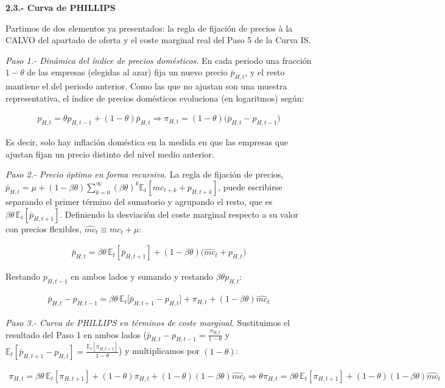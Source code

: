 \documentclass[10pt,a4paper]{article}
\begin{document}
\textbf{2.3.- Curva de PHILLIPS}

Partimos de dos elementos ya presentados: la regla de fijación de precios à la CALVO del apartado de oferta y el coste marginal real del Paso 5 de la Curva IS.

\textit{Paso 1.- Dinámica del índice de precios domésticos.} En cada periodo una fracción $1-\theta$ de las empresas (elegidas al azar) fija un nuevo precio $\bar p_{H,t}$, y el resto mantiene el del periodo anterior. Como las que no ajustan son una muestra representativa, el índice de precios domésticos evoluciona (en logaritmos) según:

$$\begin{aligned}
    p_{H,t}=\theta p_{H,t-1}+(1-\theta)\bar p_{H,t}\Longrightarrow \boxed{\pi_{H,t}=(1-\theta)\big(\bar p_{H,t}-p_{H,t-1}\big)}
\end{aligned}$$

Es decir, solo hay inflación doméstica en la medida en que las empresas que ajustan fijan un precio distinto del nivel medio anterior.

\textit{Paso 2.- Precio óptimo en forma recursiva.} La regla de fijación de precios, $\bar p_{H,t}=\mu+(1-\beta\theta)\sum_{k=0}^{\infty}(\beta\theta)^k\mathbb E_t[mc_{t+k}+p_{H,t+k}]$, puede escribirse separando el primer término del sumatorio y agrupando el resto, que es $\beta\theta\,\mathbb E_t[\bar p_{H,t+1}]$. Definiendo la desviación del coste marginal respecto a su valor con precios flexibles, $\widehat{mc}_t\equiv mc_t+\mu$:

$$\begin{aligned}
    \bar p_{H,t}=\beta\theta\,\mathbb E_t[\bar p_{H,t+1}]+(1-\beta\theta)\big(\widehat{mc}_t+p_{H,t}\big)
\end{aligned}$$

Restando $p_{H,t-1}$ en ambos lados y sumando y restando $\beta\theta p_{H,t}$:

$$\begin{aligned}
    \bar p_{H,t}-p_{H,t-1}=\beta\theta\,\mathbb E_t\big[\bar p_{H,t+1}-p_{H,t}\big]+\pi_{H,t}+(1-\beta\theta)\widehat{mc}_t
\end{aligned}$$

\textit{Paso 3.- Curva de PHILLIPS en términos de coste marginal.} Sustituimos el resultado del Paso 1 en ambos lados ($\bar p_{H,t}-p_{H,t-1}=\frac{\pi_{H,t}}{1-\theta}$ y $\mathbb E_t[\bar p_{H,t+1}-p_{H,t}]=\frac{\mathbb E_t[\pi_{H,t+1}]}{1-\theta}$) y multiplicamos por $(1-\theta)$:

$$\begin{aligned}
    \pi_{H,t}=\beta\theta\,\mathbb E_t[\pi_{H,t+1}]+(1-\theta)\pi_{H,t}+(1-\theta)(1-\beta\theta)\widehat{mc}_t\Longrightarrow\theta\pi_{H,t}=\beta\theta\,\mathbb E_t[\pi_{H,t+1}]+(1-\theta)(1-\beta\theta)\widehat{mc}_t
\end{aligned}$$
\end{document}
